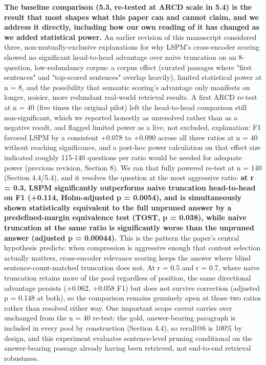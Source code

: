\textbf{The baseline comparison (5.3, re-tested at ARCD scale in 5.4) is the result that most shapes what this paper can and cannot claim, and we address it directly, including how our own reading of it has changed as we added statistical power.} An earlier revision of this manuscript considered three, non-mutually-exclusive explanations for why LSPM's cross-encoder scoring showed no significant head-to-head advantage over naive truncation on an 8-question, low-redundancy corpus: a corpus effect (curated passages where "first sentences" and "top-scored sentences" overlap heavily), limited statistical power at n = 8, and the possibility that semantic scoring's advantage only manifests on longer, noisier, more redundant real-world retrieval results. A first ARCD re-test at n = 40 (five times the original pilot) left the head-to-head comparison still non-significant, which we reported honestly as unresolved rather than as a negative result, and flagged limited power as a live, not excluded, explanation: F1 favored LSPM by a consistent +0.078 to +0.090 across all three ratios at n = 40 without reaching significance, and a post-hoc power calculation on that effect size indicated roughly 115-140 questions per ratio would be needed for adequate power (previous revision, Section 8). We ran that fully powered re-test at n = 140 (Section 4.4/5.4), and it resolves the question at the most aggressive ratio: \textbf{at r = 0.3, LSPM significantly outperforms naive truncation head-to-head on F1 (+0.114, Holm-adjusted p = 0.0054), and is simultaneously shown statistically equivalent to the full unpruned answer by a predefined-margin equivalence test (TOST, p = 0.038), while naive truncation at the same ratio is significantly worse than the unpruned answer (adjusted p = 0.00044).} This is the pattern the paper's central hypothesis predicts: when compression is aggressive enough that content selection actually matters, cross-encoder relevance scoring keeps the answer where blind sentence-count-matched truncation does not. At r = 0.5 and r = 0.7, where naive truncation retains more of the pool regardless of position, the same directional advantage persists (+0.062, +0.058 F1) but does not survive correction (adjusted p = 0.148 at both), so the comparison remains genuinely open at those two ratios rather than resolved either way. One important scope caveat carries over unchanged from the n = 40 re-test: the gold, answer-bearing paragraph is included in every pool by construction (Section 4.4), so recall@6 is 100\% by design, and this experiment evaluates sentence-level pruning conditional on the answer-bearing passage already having been retrieved, not end-to-end retrieval robustness.

